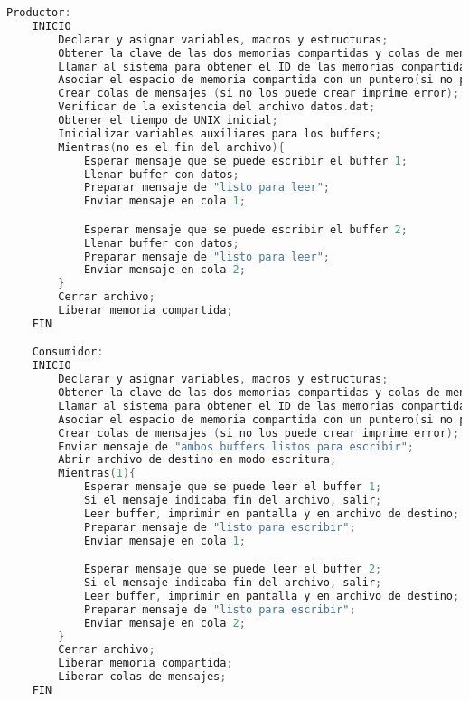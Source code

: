 \begin{lstlisting}[language=C]          % No usar tildes en el pseudocódigo
    Productor:
    INICIO
        Declarar y asignar variables, macros y estructuras;
        Obtener la clave de las dos memorias compartidas y colas de mensaje (en el caso de que no las obtenga imprime error);
        Llamar al sistema para obtener el ID de las memorias compartidas (en el caso de que no las obtenga imprime error);
        Asociar el espacio de memoria compartida con un puntero(si no puede asociar imprime error);
        Crear colas de mensajes (si no los puede crear imprime error);
        Verificar de la existencia del archivo datos.dat;
        Obtener el tiempo de UNIX inicial;
        Inicializar variables auxiliares para los buffers;
        Mientras(no es el fin del archivo){
            Esperar mensaje que se puede escribir el buffer 1;
            Llenar buffer con datos;
            Preparar mensaje de "listo para leer";
            Enviar mensaje en cola 1;

            Esperar mensaje que se puede escribir el buffer 2;
            Llenar buffer con datos;
            Preparar mensaje de "listo para leer";
            Enviar mensaje en cola 2;
        }
        Cerrar archivo;
        Liberar memoria compartida;
    FIN

    Consumidor:
    INICIO
        Declarar y asignar variables, macros y estructuras;
        Obtener la clave de las dos memorias compartidas y colas de mensaje (en el caso de que no las obtenga imprime error);
        Llamar al sistema para obtener el ID de las memorias compartidas (en el caso de que no las obtenga imprime error);
        Asociar el espacio de memoria compartida con un puntero(si no puede asociar imprime error);
        Crear colas de mensajes (si no los puede crear imprime error);
        Enviar mensaje de "ambos buffers listos para escribir";
        Abrir archivo de destino en modo escritura;
        Mientras(1){
            Esperar mensaje que se puede leer el buffer 1;
            Si el mensaje indicaba fin del archivo, salir;
            Leer buffer, imprimir en pantalla y en archivo de destino;
            Preparar mensaje de "listo para escribir";
            Enviar mensaje en cola 1;

            Esperar mensaje que se puede leer el buffer 2;
            Si el mensaje indicaba fin del archivo, salir;
            Leer buffer, imprimir en pantalla y en archivo de destino;
            Preparar mensaje de "listo para escribir";
            Enviar mensaje en cola 2;
        }
        Cerrar archivo;
        Liberar memoria compartida;
        Liberar colas de mensajes;
    FIN
    
\end{lstlisting}

